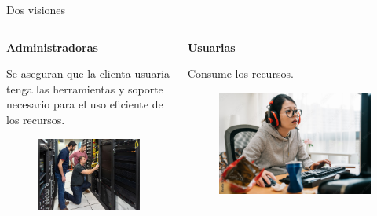 \documentclass[11pt]{beamer}
\begin{document}
\begin{frame}{Dos visiones}
\begin{columns}
\begin{column}{0.5\textwidth}
  \textbf{Administradoras}
  
  Se aseguran que la clienta-usuaria tenga las herramientas y soporte necesario para el uso eficiente de los recursos.
  \begin{figure}
  	\includegraphics[scale=0.2]{images/sysadmin_humano}
  \end{figure}
\end{column}
\begin{column}{0.5\textwidth}  %
  \textbf{Usuarias}
  
  Consume los recursos.
  \vspace{1.4cm}
    \begin{figure}
  	\includegraphics[scale=0.65]{images/usuario_hpc}

  \end{figure}
\end{column}
\end{columns}
\end{frame}
\end{document}
